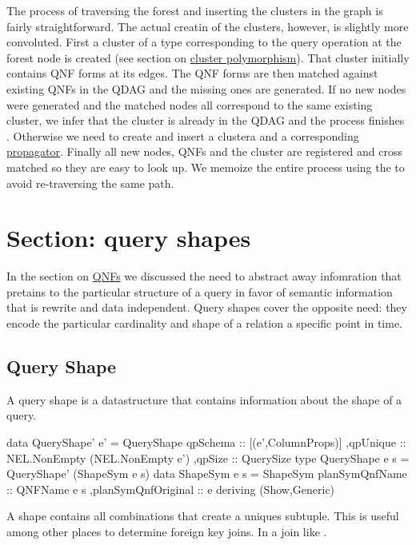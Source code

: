 The process of traversing the forest and inserting the clusters in the
graph is fairly straightforward. The actual creatin of the clusters,
however, is slightly more convoluted. First a cluster of a type
corresponding to the query operation at the forest node is created
(see section on \hyperref[sec:orgadee761]{cluster polymorphism}). That cluster initially contains
QNF forms at its edges. The QNF forms are then matched against
existing QNFs in the QDAG and the missing ones are generated. If no
new nodes were generated and the matched nodes all correspond to the
same existing cluster, we infer that the cluster is already in the
QDAG and the process finishes . Otherwise we need to create and insert
a clustera and a corresponding \hyperref[sec:org089acdd]{propagator}. Finally all new nodes, QNFs
and the cluster are registered and cross matched so they are easy to
look up. We memoize the entire process using the  to avoid
re-traversing the same path.


\section{Section: query shapes}
\label{sec:org2633f87}
In the section on \hyperref[sec:org9e7f455]{QNFs} we discussed the need to abstract away
infomration that pretains to the particular structure of a query in
favor of semantic information that is rewrite and data
independent. Query shapes cover the opposite need: they encode the
particular cardinality and shape of a relation a specific point in
time.

\subsection{Query Shape}
\label{sec:org17d410b}
A query shape is a datastructure that contains information about the
shape  of a query.

\begin{haskellcode}
  data QueryShape' e' =
  QueryShape
  { qpSchema :: [(e',ColumnProps)]
    ,qpUnique :: NEL.NonEmpty (NEL.NonEmpty e')
    ,qpSize :: QuerySize
  }
  type QueryShape e s = QueryShape' (ShapeSym e s)
  data ShapeSym e s =
  ShapeSym { planSymQnfName :: QNFName e s
    ,planSymQnfOriginal :: e
  }
  deriving (Show,Generic)
\end{haskellcode}

A shape contains all combinations that create a uniques subtuple. This
is useful among other places to determine foreign key joins. In a join
like .

